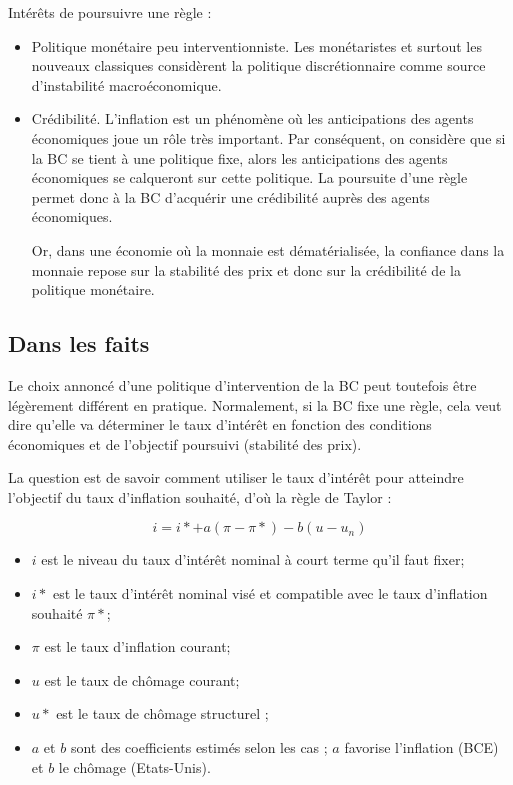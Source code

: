 Intérêts de poursuivre une règle : 

\begin{itemize}
	\item Politique monétaire peu interventionniste. Les monétaristes et surtout les nouveaux classiques considèrent la politique discrétionnaire comme source d'instabilité macroéconomique.
	\item Crédibilité. L'inflation est un phénomène où les anticipations des agents économiques joue un rôle très important. Par conséquent, on considère que si la BC se tient à une politique fixe, alors les anticipations des agents économiques se calqueront sur cette politique. La poursuite d'une règle permet donc à la BC d'acquérir une crédibilité auprès des agents économiques.

	Or, dans une économie où la monnaie est dématérialisée, la confiance dans la monnaie repose sur la stabilité des prix et donc sur la crédibilité de la politique monétaire.
\end{itemize}

	\subsection{Dans les faits}
	
	Le choix annoncé d'une politique d'intervention de la BC peut toutefois être légèrement différent en pratique. Normalement, si la BC fixe une règle, cela veut dire qu'elle va déterminer le taux d'intérêt en fonction des conditions économiques et de l'objectif poursuivi (stabilité des prix).
	
	La question est de savoir comment utiliser le taux d'intérêt pour atteindre 
l'objectif du taux d'inflation souhaité, d'où la règle de Taylor :

	$$i = i* + a(\pi - \pi*) - b(u - u_n)$$

	\begin{itemize}
		\item $i$ est le niveau du taux d'intérêt nominal à court terme qu'il faut fixer;
		\item $i*$ est le taux d'intérêt nominal visé et compatible avec le taux d'inflation souhaité $\pi*$;
		\item $\pi$ est le taux d'inflation courant;
		\item $u$ est le taux de chômage courant;
		\item $u*$ est le taux de chômage structurel ;
		\item $a$ et $b$ sont des coefficients estimés selon les cas ; $a$ favorise l'inflation (BCE) et $b$ le chômage (Etats-Unis).
	\end{itemize}
